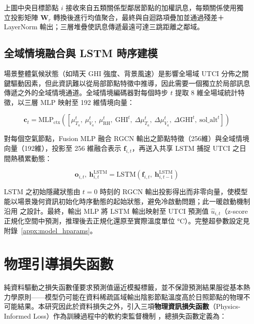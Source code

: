 上圖中央目標節點 $i$ 接收來自五類關係型鄰居節點的加權訊息，每類關係使用獨立投影矩陣 $\mathbf{W}_r$ 轉換後進行均值聚合，最終與自迴路項疊加並通過殘差＋LayerNorm 輸出；三層堆疊使訊息傳遞最遠可達三跳距離之鄰域。


\subsection{全域情境融合與 LSTM 時序建模}
\label{subsec:lstm}

場景整體氣候狀態（如晴天 GHI 強度、背景風速）是影響全場域 UTCI 分佈之關鍵驅動因素，但此資訊難以從局部節點特徵中推導，因此需要一個獨立於局部訊息傳遞之外的全域情境通道。全域情境編碼器對每個時步 $t$ 提取 8 維全場域統計特徵，以三層 MLP 映射至 192 維情境向量：

\begin{equation}
    \mathbf{c}_t = \text{MLP}_{\text{ctx}}\!\left( \left[\mu_{T_a}^t,\ \mu_{V_a}^t,\ \mu_{\text{RH}}^t,\ \text{GHI}^t,\ \Delta\mu_{T_a}^t,\ \Delta\mu_{V_a}^t,\ \Delta\text{GHI}^t,\ \text{sol\_alt}^t \right] \right)
    \label{eq:ctx}
\end{equation}

對每個空氣節點，Fusion MLP 融合 RGCN 輸出之節點特徵（256維）與全域情境向量（192維），投影至 256 維融合表示 $\mathbf{f}_{i,t}$，再送入共享 LSTM 捕捉 UTCI 之日間熱積累動態：

\begin{equation}
    \mathbf{o}_{i,t},\ \mathbf{h}_{i,t}^{\text{LSTM}} = \text{LSTM}\!\left( \mathbf{f}_{i,t},\ \mathbf{h}_{i,t-1}^{\text{LSTM}} \right)
    \label{eq:lstm}
\end{equation}

LSTM 之初始隱藏狀態由 $t=0$ 時刻的 RGCN 輸出投影得出而非零向量，使模型能以場景幾何資訊初始化時序動態的起始狀態，避免冷啟動問題；此一暖啟動機制沿用 \citet{xin2025urbangraph} 之設計。最終，輸出 MLP 將 LSTM 輸出映射至 UTCI 預測值 $\hat{u}_{i,t}$（z-score 正規化空間中預測，推理後去正規化還原至實際溫度單位 °C）。完整超參數設定見附錄~\ref{appx:model_hparams}。


\section{物理引導損失函數}
\label{sec:physics_loss}

純資料驅動之損失函數僅要求預測值逼近模擬標籤，並不保證預測結果服從基本熱力學原則——模型仍可能在資料稀疏區域輸出陰影節點溫度高於日照節點的物理不可能結果。本研究因此於資料損失之外，引入三項\textbf{物理資訊損失函數}（Physics-Informed Loss）作為訓練過程中的軟約束監督機制 \citep{shan2025physics}，總損失函數定義為：

